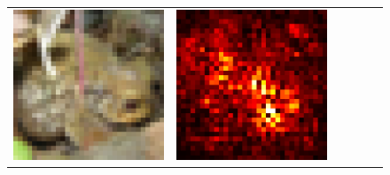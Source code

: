 \documentclass[preprint,12pt]{elsarticle}
\begin{document}
\begin{figure}[p]
\begin{tabular}{cccccc}
  \includegraphics[scale=\scale]{../visualizations/examples/cifar10/cnn/images/6.png} &
  \includegraphics[scale=\scale]{../visualizations/examples/cifar10/cnn/saliency_map/6.png} & 

\end{tabular}
\end{figure}
\end{document}
